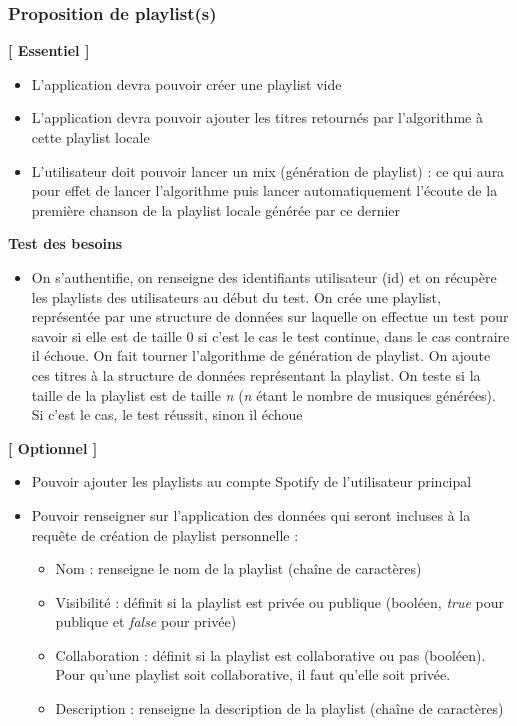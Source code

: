 \documentclass{article}
\begin{document}
		\subsubsection{Proposition de playlist(s)}
		\textbf{[ Essentiel ]}
		\begin{itemize}
			\item L'application devra pouvoir créer une playlist vide
			\item L'application devra pouvoir ajouter les titres retournés par l'algorithme à cette playlist locale
			\item L'utilisateur doit pouvoir lancer un mix (génération de playlist) : ce qui aura pour effet de lancer l'algorithme puis lancer automatiquement l'écoute de la première chanson de la playlist locale générée par ce dernier
		\end{itemize}
		\textbf{Test des besoins}
		\begin{itemize}
			\item On s'authentifie, on renseigne des identifiants utilisateur (id) et on récupère les playlists des utilisateurs au début du test. On crée une playlist, représentée par une structure de données sur laquelle on effectue un test pour savoir si elle est de taille 0 si c'est le cas le test continue, dans le cas contraire il échoue. On fait tourner l'algorithme de génération de playlist. On ajoute ces titres à la structure de données représentant la playlist. On teste si la taille de la playlist est de taille \textit{n} (\textit{n} étant le nombre de musiques générées). Si c'est le cas, le test réussit, sinon il échoue
		\end{itemize}
		\textbf{[ Optionnel ]}
		\begin{itemize}
			\item Pouvoir ajouter les playlists au compte Spotify de l'utilisateur principal
			\item Pouvoir renseigner sur l'application des données qui seront incluses à la requête de création de playlist personnelle : 
			      \begin{itemize}
			      	\item Nom : renseigne le nom de la playlist (chaîne de caractères)
			      	\item Visibilité : définit si la playlist est privée ou publique (booléen, \textit{true} pour publique et \textit{false} pour privée)
			      	\item Collaboration : définit si la playlist est collaborative ou pas (booléen). Pour qu'une playlist soit collaborative, il faut qu'elle soit privée.
			      	\item Description : renseigne la description de la playlist (chaîne de caractères)
			      \end{itemize}
		\end{itemize}
\end{document}
